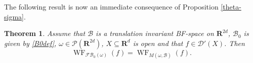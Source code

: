 \documentclass[12pt,a4paper,reqno]{amsart}
\numberwithin{equation}{section}
\newtheorem{thm}{Theorem}
\numberwithin{thm}{section}
\theoremstyle{definition}
\theoremstyle{remark}
\begin{document}
\par

The following result is now an immediate consequence of Proposition \ref{theta-sigma}.

\par

\begin{thm}\label{WFidentity}
Assume that $\mathscr B$ is a translation invariant BF-space on ${\mathbf R^{{2d}}}$, $\mathscr B_0$ is given by \eqref{B0def}, $\omega \in \mathscr P({\mathbf R^{{2d}}})$, $X\subseteq {\mathbf R^{d}}$ is open and that $f\in \mathscr D'(X)$. Then
$$
{\operatorname{WF}}_{{\mathscr F\! \mathscr B} _0(\omega )}(f) = {\operatorname{WF}} _{M(\omega ,\mathscr B)}(f).
$$
\end{thm}

\par

\vspace{2cm}
\end{document}
